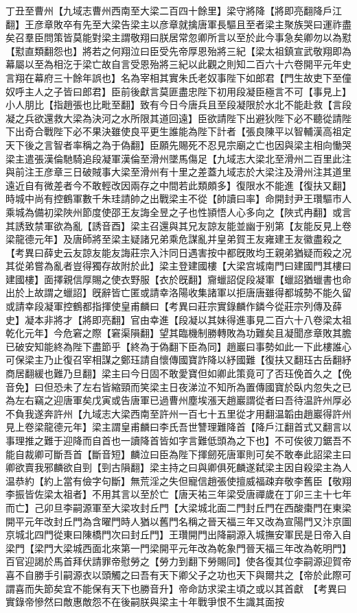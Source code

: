 丁丑至曹州【九域志曹州西南至大梁二百四十餘里】梁守將降【將即亮翻降戶江翻】王彦章敗卒有先至大梁告梁主以彦章就擒唐軍長驅且至者梁主聚族哭曰運祚盡矣召羣臣問策皆莫能對梁主謂敬翔曰朕居常忽卿所言以至於此今事急矣卿勿以為懟【懟直類翻怨也】將若之何翔泣曰臣受先帝厚恩殆將三紀【梁太祖鎮宣武敬翔即為幕屬以至為相汔于梁亡故自言受恩殆將三紀以此觀之則知二百六十六卷開平元年史言翔在幕府三十餘年誤也】名為宰相其實朱氏老奴事陛下如郎君【門生故吏下至僮奴呼主人之子皆曰郎君】臣前後獻言莫匪盡忠陛下初用段凝臣極言不可【事見上】小人朋比【指趙張也比毗至翻】致有今日今唐兵且至段凝限於水北不能赴救【言段凝之兵欲還救大梁為決河之水所限其道回遠】臣欲請陛下出避狄陛下必不聽從請陛下出奇合戰陛下必不果決雖使良平更生誰能為陛下計者【張良陳平以智輔漢高祖定天下後之言智者率稱之為于偽翻】臣願先賜死不忍見宗廟之亡也因與梁主相向慟哭梁主遣張漢倫馳騎追段凝軍漢倫至滑州墜馬傷足【九域志大梁北至滑州二百里此注與前注王彦章三日破賊事大梁至滑州有十里之差蓋九域志於大梁注及滑州注其道里遠近自有微差者今不敢輕改因兩存之中間若此類頗多】復限水不能進【復扶又翻】時城中尚有控鶴軍數千朱珪請帥之出戰梁主不從【帥讀曰率】命開封尹王瓚驅市人乘城為備初梁陜州節度使邵王友誨全昱之子也性頴悟人心多向之【陜式冉翻】或言其誘致禁軍欲為亂【誘音酉】梁主召還與其兄友諒友能並幽于别第【友能反見上卷梁龍德元年】及唐師將至梁主疑諸兄弟乘危謀亂并皇弟賀王友雍建王友徽盡殺之　【考異曰薛史云友諒友能友誨莊宗入汴同日遇害按中都旣敗均王親弟猶疑而殺之况其從弟嘗為亂者豈得獨存故附於此】梁主登建國樓【大梁宫城南門曰建國門其樓曰建國樓】面擇親信厚賜之使衣野服【衣於旣翻】齎蠟詔促段凝軍【蠟詔猶蠟書也命出於上故謂之蠟詔】旣辭皆亡匿或請幸洛陽收集諸軍以拒唐唐雖得都城勢不能久留或請幸段凝軍控鶴都指揮使皇甫麟曰【考異曰莊宗實錄麟作鏻今從莊宗列傳及薛史】凝本非將才【將即亮翻】官由幸進【段凝以其妹得進事見二百六十八卷梁太祖乾化元年】今危窘之際【窘渠隕翻】望其臨機制勝轉敗為功難矣且凝聞彦章敗其膽已破安知能終為陛下盡節乎【終為于偽翻下臣為同】趙巖曰事勢如此一下此樓誰心可保梁主乃止復召宰相謀之鄭珏請自懷傳國寶詐降以紓國難【復扶又翻珏古岳翻紓商居翻緩也難乃旦翻】梁主曰今日固不敢愛寶但如卿此策竟可了否珏俛首久之【俛音免】曰但恐未了左右皆縮頸而笑梁主日夜涕泣不知所為置傳國寶於臥内忽失之已為左右竊之迎唐軍矣戊寅或告唐軍已過曹州塵埃漲天趙巖謂從者曰吾待温許州厚必不負我遂奔許州【九域志大梁西南至許州一百七十五里從才用翻温韜由趙巖得許州見上卷梁龍德元年】梁主謂皇甫麟曰李氏吾世讐理難降首【降戶江翻首式又翻言以事理推之難于迎降而自首也一讀降首皆如字言難低頭為之下也】不可俟彼刀鋸吾不能自裁卿可斷吾首【斷音短】麟泣曰臣為陛下揮劒死唐軍則可矣不敢奉此詔梁主曰卿欲賣我邪麟欲自剄【剄古隕翻】梁主持之曰與卿俱死麟遂弑梁主因自殺梁主為人温恭約【約上當有儉字句斷】無荒淫之失但寵信趙張使擅威福疎弃敬李舊臣【敬翔李振皆佐梁太祖者】不用其言以至於亡【唐天祐三年梁受唐禪歲在丁卯三主十七年而亡】己卯旦李嗣源軍至大梁攻封丘門【大梁城北面二門封丘門在西酸棗門在東梁開平元年改封丘門為含曜門時人猶以舊門名稱之晉天福三年又改為宣陽門又汴京圖京城北四門從東曰陳橋門次曰封丘門】王瓚開門出降嗣源入城撫安軍民是日帝入自梁門【梁門大梁城西面北來第一門梁開平元年改為乾象門晉天福三年改為乾明門】百官迎謁於馬首拜伏請罪帝慰勞之【勞力到翻下勞賜同】使各復其位李嗣源迎賀帝喜不自勝手引嗣源衣以頭觸之曰吾有天下卿父子之功也天下與爾共之【帝於此際可謂喜而失節矣宜不能保有天下也勝音升】帝命訪求梁主頃之或以其首獻　【考異曰實錄帝慘然曰敵惠敵怨不在後嗣朕與梁主十年戰爭恨不生識其面按